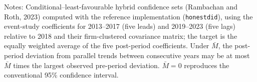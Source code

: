 \begin{table}[htbp]
\par\vspace{3pt}\begin{minipage}{\textwidth}\footnotesize
Notes: Conditional--least-favourable hybrid confidence sets (Rambachan and Roth, 2023) computed with the reference implementation (\texttt{honestdid}), using the event-study coefficients for 2013--2017 (five leads) and 2019--2023 (five lags) relative to 2018 and their firm-clustered covariance matrix; the target is the equally weighted average of the five post-period coefficients. Under $\bar M$, the post-period deviation from parallel trends between consecutive years may be at most $\bar M$ times the largest observed pre-period deviation. $\bar M=0$ reproduces the conventional 95\% confidence interval.
\end{minipage}
\end{table}
